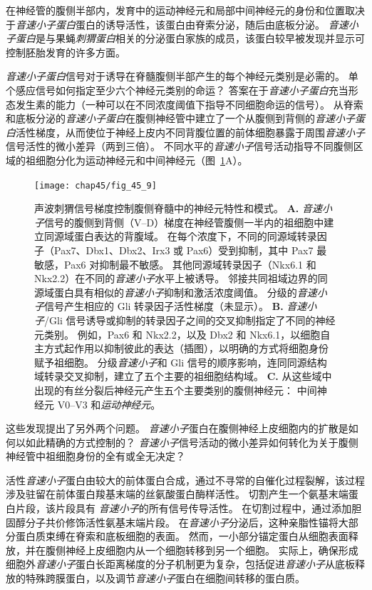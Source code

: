 在神经管的腹侧半部内，发育中的运动神经元和局部中间神经元的身份和位置取决于\textit{音速小子蛋白}蛋白的诱导活性，该蛋白由脊索分泌，随后由底板分泌。
\textit{音速小子蛋白}是与果蝇\textit{刺猬蛋白}相关的分泌蛋白家族的成员，该蛋白较早被发现并显示可控制胚胎发育的许多方面。


\textit{音速小子蛋白}信号对于诱导在脊髓腹侧半部产生的每个神经元类别是必需的。
单个感应信号如何指定至少六个神经元类别的命运？
答案在于\textit{音速小子蛋白}充当形态发生素的能力（一种可以在不同浓度阈值下指导不同细胞命运的信号）。
从脊索和底板分泌的\textit{音速小子蛋白}在腹侧神经管中建立了一个从腹侧到背侧的\textit{音速小子蛋白}活性梯度，从而使位于神经上皮内不同背腹位置的前体细胞暴露于周围\textit{音速小子}信号活性的微小差异（两到三倍）。
不同水平的\textit{音速小子}信号活动指导不同腹侧区域的祖细胞分化为运动神经元和中间神经元（图~\ref{fig:45_9}A）。


\begin{figure}[htbp]
	\centering
	\texttt{[image: chap45/fig\_45\_9]}
	\caption{声波刺猬信号梯度控制腹侧脊髓中的神经元特性和模式。
		\textbf{A.} \textit{音速小子}信号的腹侧到背侧（V–D）梯度在神经管腹侧一半内的祖细胞中建立同源域蛋白表达的背腹域。
		在每个浓度下，不同的同源域转录因子（Pax7、Dbx1、Dbx2、Irx3 或 Pax6）受到抑制，其中 Pax7 最敏感，Pax6 对抑制最不敏感。
		其他同源域转录因子（Nkx6.1 和 Nkx2.2）在不同的\textit{音速小子}水平上被诱导。
		邻接共同祖域边界的同源域蛋白具有相似的\textit{音速小子}抑制和激活浓度阈值。
		分级的\textit{音速小子}信号产生相应的 Gli 转录因子活性梯度（未显示）。
		\textbf{B.} \textit{音速小子}/Gli 信号诱导或抑制的转录因子之间的交叉抑制指定了不同的神经元类别。
		例如，Pax6 和 Nkx2.2，以及 Dbx2 和 Nkx6.1，以细胞自主方式起作用以抑制彼此的表达（插图），以明确的方式将细胞身份赋予祖细胞。
		分级\textit{音速小子}和 Gli 信号的顺序影响，连同同源结构域转录交叉抑制，建立了五个主要的祖细胞结构域。
		\textbf{C.} 从这些域中出现的有丝分裂后神经元产生五个主要类别的腹侧神经元：
		中间神经元 V0–V3 和\textit{运动神经元}。}
	\label{fig:45_9}
\end{figure}


这些发现提出了另外两个问题。
\textit{音速小子}蛋白在腹侧神经上皮细胞内的扩散是如何以如此精确的方式控制的？
\textit{音速小子}信号活动的微小差异如何转化为关于腹侧神经管中祖细胞身份的全有或全无决定？


活性\textit{音速小子}蛋白由较大的前体蛋白合成，通过不寻常的自催化过程裂解，该过程涉及驻留在前体蛋白羧基末端的丝氨酸蛋白酶样活性。
切割产生一个氨基末端蛋白片段，该片段具有 \textit{音速小子}的所有信号传导活性。
在切割过程中，通过添加胆固醇分子共价修饰活性氨基末端片段。
在\textit{音速小子}分泌后，这种亲脂性锚将大部分蛋白质束缚在脊索和底板细胞的表面。
然而，一小部分锚定蛋白从细胞表面释放，并在腹侧神经上皮细胞内从一个细胞转移到另一个细胞。
实际上，确保形成细胞外\textit{音速小子}蛋白长距离梯度的分子机制更为复杂，包括促进\textit{音速小子}从底板释放的特殊跨膜蛋白，以及调节\textit{音速小子}蛋白在细胞间转移的蛋白质。


